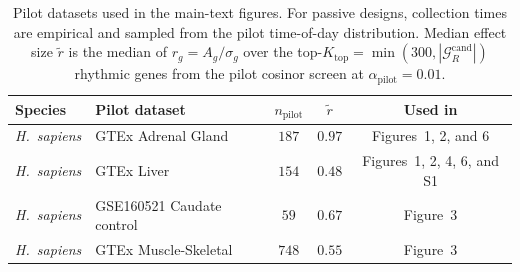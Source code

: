 \begin{table}[!htbp]
\centering
\small
\caption{Pilot datasets used in the main-text figures. For passive
designs, collection times are empirical and sampled from the pilot
time-of-day distribution. Median effect size $\tilde r$ is the median
of $r_g = A_g/\sigma_g$ over the top-$K_{\mathrm{top}}=\min(300,|\mathcal{G}_R^{\mathrm{cand}}|)$
rhythmic genes
 from the
pilot cosinor screen at $\alpha_{\mathrm{pilot}} = 0.01$.}
\label{tab:pilot_summary}
\begin{tabular}{llccc}
\toprule
Species & Pilot dataset & $n_{\mathrm{pilot}}$ & $\tilde r$ & Used in \\
\midrule
\textit{H.\ sapiens} & GTEx Adrenal Gland & $187$ & $0.97$ & Figures~1, 2, and 6 \\
\textit{H.\ sapiens} & GTEx Liver & $154$ & $0.48$ & Figures~1, 2, 4, 6, and S1 \\
\textit{H.\ sapiens} & GSE160521 Caudate control & $59$ & $0.67$ & Figure~3 \\
\textit{H.\ sapiens} & GTEx Muscle-Skeletal & $748$ & $0.55$ & Figure~3 \\
\bottomrule
\end{tabular}
\end{table}
